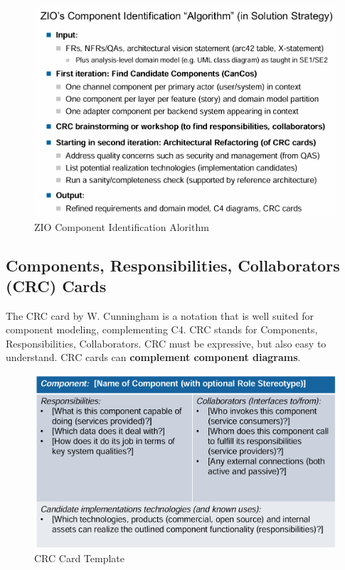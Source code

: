 \documentclass[../Main.tex]{subfiles}
\begin{document}
\begin{figure}[H]
    \centering
    \includegraphics[width=1\linewidth]{Images/zio-idenfitication-algorithm.png}
    \caption{ZIO Component Identification Alorithm}
\end{figure}

\subsection{Components, Responsibilities, Collaborators (CRC) Cards}
The CRC card by W. Cunningham is a notation that is well suited for component modeling, 
complementing C4. CRC stands for Components, Responsibilities, Collaborators.
CRC must be expressive, but also easy to understand.
CRC cards can \textbf{complement component diagrams}.

\begin{figure}[H]
    \centering
    \includegraphics[width=1\linewidth]{Images/crc-card.png}
    \caption{CRC Card Template}
\end{figure}
\newpage
\end{document}
